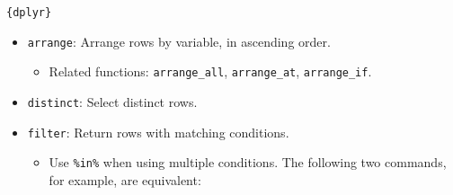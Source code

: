 \documentclass[
]{book}
\newenvironment{Shaded}{\begin{snugshade}}{\end{snugshade}}
\newcommand{\KeywordTok}[1]{\textcolor[rgb]{0.13,0.29,0.53}{\textbf{#1}}}
\newcommand{\NormalTok}[1]{#1}
\newcommand{\OperatorTok}[1]{\textcolor[rgb]{0.81,0.36,0.00}{\textbf{#1}}}
\newcommand{\StringTok}[1]{\textcolor[rgb]{0.31,0.60,0.02}{#1}}
\providecommand{\tightlist}{%
  \setlength{\itemsep}{0pt}\setlength{\parskip}{0pt}}
\begin{document}
\texttt{\{dplyr\}}

\begin{itemize}
\tightlist
\item
  \texttt{arrange}: Arrange rows by variable, in ascending order.

  \begin{itemize}
  \tightlist
  \item
    Related functions: \texttt{arrange\_all}, \texttt{arrange\_at}, \texttt{arrange\_if}.
  \end{itemize}
\item
  \texttt{distinct}: Select distinct rows.
\item
  \texttt{filter}: Return rows with matching conditions.

  \begin{itemize}
  \tightlist
  \item
    Use \texttt{\%in\%} when using multiple \texttt{\textbar{}} conditions. The following two commands, for example, are equivalent:
  \end{itemize}
\end{itemize}

\begin{Shaded}
\end{Shaded}
\end{document}
